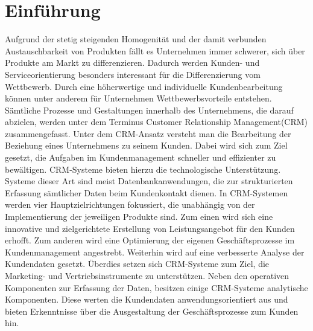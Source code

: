 \chapter{Einführung}
\label{ch:Einfuehrung}

Aufgrund der stetig steigenden Homogenität und der damit verbunden Austauschbarkeit von Produkten fällt es Unternehmen immer schwerer, sich über Produkte am Markt zu differenzieren. Dadurch werden Kunden- und Serviceorientierung besonders interessant für die Differenzierung vom Wettbewerb. Durch eine höherwertige und individuelle Kundenbearbeitung können unter anderem für Unternehmen Wettbewerbsvorteile entstehen. Sämtliche Prozesse und Gestaltungen innerhalb des Unternehmens, die darauf abzielen, werden unter dem Terminus Customer Relationship Management(CRM) zusammengefasst. Unter dem CRM-Ansatz versteht man die Bearbeitung der Beziehung eines Unternehmens zu seinem Kunden. Dabei wird sich zum Ziel gesetzt, die Aufgaben im Kundenmanagement schneller und effizienter zu bewältigen. CRM-Systeme bieten hierzu die technologische Unterstützung. Systeme dieser Art sind meist Datenbankanwendungen, die zur strukturierten Erfassung sämtlicher Daten beim Kundenkontakt dienen. In CRM-Systemen werden vier Hauptzielrichtungen fokussiert, die unabhängig von der Implementierung der jeweiligen Produkte sind. Zum einen wird sich eine innovative und zielgerichtete Erstellung von Leistungsangebot für den Kunden erhofft. Zum anderen wird eine Optimierung der eigenen Geschäftsprozesse im Kundenmanagement angestrebt. Weiterhin wird auf eine verbesserte Analyse der Kundendaten gesetzt. Überdies setzen sich CRM-Systeme zum Ziel, die Marketing- und Vertriebsinstrumente zu unterstützen. Neben den operativen Komponenten zur Erfassung der Daten, besitzen einige CRM-Systeme analytische Komponenten. Diese werten die Kundendaten anwendungsorientiert aus und bieten Erkenntnisse über die Ausgestaltung der Geschäftsprozesse zum Kunden hin.

